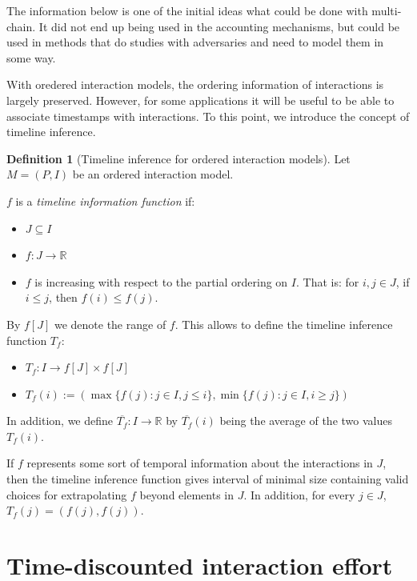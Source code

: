 \documentclass[a4paper,11pt]{book}
\newcommand{\bb}{\mathbb}
\newcommand{\ov}{\overline}
\theoremstyle{definition}
\newtheorem{definition}{Definition}
\begin{document}
The information below is one of the initial ideas what could be done with multi-chain. It did not end up being
used in the accounting mechanisms, but could be used in methods that do studies with adversaries and need
to model them in some way.
    
With oredered interaction models, the ordering information of interactions is largely preserved. However, for some
applications it will be useful to be able to associate timestamps with interactions. To
this point, we introduce the concept of timeline inference.

\begin{definition}[Timeline inference for ordered interaction models]
    Let $M = (P, I)$ be an ordered interaction model. 

    $f$ is a \emph{timeline information function} if:
    \begin{itemize}
        \item $J \subseteq I$ 
        \item $f : J \to \bb{R}$
        \item $f$ is increasing with respect to the partial ordering on $I$. That is:
            for $i,j \in J$, if $i \leq j$, then $f(i) \leq f(j)$. 
    \end{itemize}

    By $f[J]$ we denote the range of $f$.
    This allows to define the timeline inference function $T_f$:

    \begin{itemize}
        \item $T_f : I \to f[J] \times f[J]$
        \item $T_f(i) := (\max \{f(j): j \in I, j \leq i\}, \min \{f(j) : j \in I, i \geq j\})$
    \end{itemize}
    
    In addition, we define $\ov{T_f} : I \to \bb{R}$ by $\ov{T_f}(i)$ being the average of the
    two values $T_f(i)$.
\end{definition}


If $f$ represents some sort of temporal information about the interactions in $J$, 
then the timeline inference function gives interval of minimal size containing valid choices for extrapolating
$f$ beyond elements in $J$. In addition, for every $j \in J$, $T_f(j) = (f(j), f(j))$.

\section{Time-discounted interaction effort}
\end{document}
